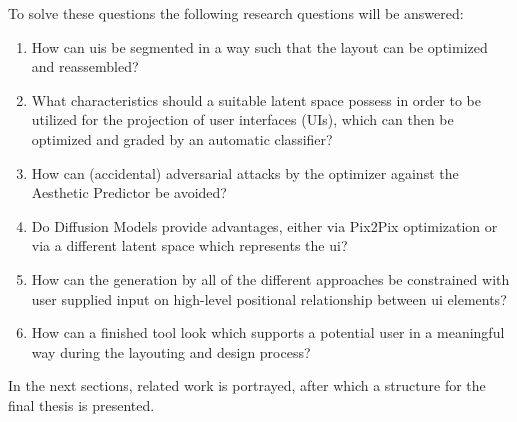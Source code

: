 \documentclass[10pt,a4paper]{scrartcl} %
\begin{document}
To solve these questions the following research questions will be answered:
\begin{enumerate}[label*=RQ \arabic*]
  \item How can \acp{ui} be segmented in a way such that the layout can be optimized and reassembled?
  \item What characteristics should a suitable latent space possess in order to be utilized for the projection of user interfaces (UIs), which can then be optimized and graded by an automatic classifier?
  \item How can (accidental) adversarial attacks by the optimizer against the Aesthetic Predictor be avoided?
  \item Do Diffusion Models provide advantages, either via Pix2Pix optimization or via a different latent space which represents the \ac{ui}?
  \item How can the generation by all of the different approaches be constrained with user supplied input on high-level positional relationship between \ac{ui} elements?
  \item How can a finished tool look which supports a potential user in a meaningful way during the layouting and design process?

  
\end{enumerate}
In the next sections, related work is portrayed, after which a structure for the final thesis is presented.
\end{document}
